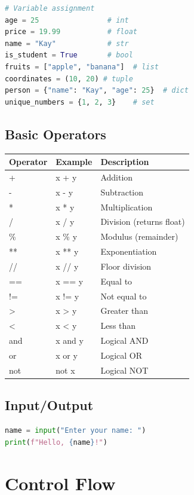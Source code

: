 \documentclass{article}
\begin{document}
\begin{lstlisting}[language=Python]
# Variable assignment
age = 25                # int
price = 19.99           # float
name = "Kay"            # str
is_student = True       # bool
fruits = ["apple", "banana"]  # list
coordinates = (10, 20) # tuple
person = {"name": "Kay", "age": 25}  # dict
unique_numbers = {1, 2, 3}    # set
\end{lstlisting}

\subsection{Basic Operators}

\begin{table}[h]
\centering
\begin{tabular}{|l|l|l|}
\hline
\textbf{Operator} & \textbf{Example} & \textbf{Description} \\
\hline
+ & x + y & Addition \\
- & x - y & Subtraction \\
* & x * y & Multiplication \\
/ & x / y & Division (returns float) \\
\% & x \% y & Modulus (remainder) \\
** & x ** y & Exponentiation \\
// & x // y & Floor division \\
== & x == y & Equal to \\
!= & x != y & Not equal to \\
> & x > y & Greater than \\
< & x < y & Less than \\
and & x and y & Logical AND \\
or & x or y & Logical OR \\
not & not x & Logical NOT \\
\hline
\end{tabular}
\end{table}

\subsection{Input/Output}

\begin{lstlisting}[language=Python]
name = input("Enter your name: ")
print(f"Hello, {name}!")
\end{lstlisting}

\section{Control Flow}
\end{document}
